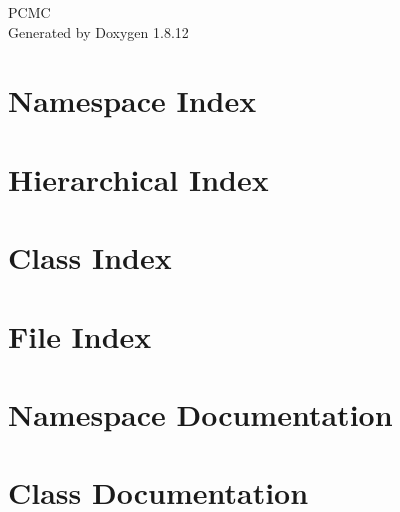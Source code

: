 \documentclass[twoside]{book}
\newcommand{\+}{\discretionary{\mbox{\scriptsize$\hookleftarrow$}}{}{}}
\newcommand{\clearemptydoublepage}{%
  \newpage{\pagestyle{empty}\cleardoublepage}%
}
\begin{document}
\hypersetup{pageanchor=false,
             bookmarksnumbered=true,
             pdfencoding=unicode
            }
\begin{titlepage}
\vspace*{7cm}
\begin{center}%
{\Large P\+C\+MC }\\
\vspace*{1cm}
{\large Generated by Doxygen 1.8.12}\\
\end{center}
\end{titlepage}
\clearemptydoublepage
{}
\tableofcontents
\clearemptydoublepage
{}
\hypersetup{pageanchor=true}

\chapter{Namespace Index}

\chapter{Hierarchical Index}

\chapter{Class Index}

\chapter{File Index}

\chapter{Namespace Documentation}


\chapter{Class Documentation}

















\end{document}

